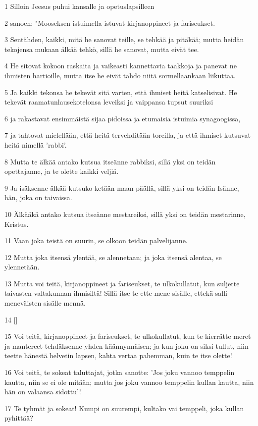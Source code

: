 \par 1 Silloin Jeesus puhui kansalle ja opetuslapsilleen
\par 2 sanoen: "Mooseksen istuimella istuvat kirjanoppineet ja fariseukset.
\par 3 Sentähden, kaikki, mitä he sanovat teille, se tehkää ja pitäkää; mutta heidän tekojensa mukaan älkää tehkö, sillä he sanovat, mutta eivät tee.
\par 4 He sitovat kokoon raskaita ja vaikeasti kannettavia taakkoja ja panevat ne ihmisten hartioille, mutta itse he eivät tahdo niitä sormellaankaan liikuttaa.
\par 5 Ja kaikki tekonsa he tekevät sitä varten, että ihmiset heitä katselisivat. He tekevät raamatunlausekotelonsa leveiksi ja vaippansa tupsut suuriksi
\par 6 ja rakastavat ensimmäistä sijaa pidoissa ja etumaisia istuimia synagoogissa,
\par 7 ja tahtovat mielellään, että heitä tervehditään toreilla, ja että ihmiset kutsuvat heitä nimellä 'rabbi'.
\par 8 Mutta te älkää antako kutsua itseänne rabbiksi, sillä yksi on teidän opettajanne, ja te olette kaikki veljiä.
\par 9 Ja isäksenne älkää kutsuko ketään maan päällä, sillä yksi on teidän Isänne, hän, joka on taivaissa.
\par 10 Älkääkä antako kutsua itseänne mestareiksi, sillä yksi on teidän mestarinne, Kristus.
\par 11 Vaan joka teistä on suurin, se olkoon teidän palvelijanne.
\par 12 Mutta joka itsensä ylentää, se alennetaan; ja joka itsensä alentaa, se ylennetään.
\par 13 Mutta voi teitä, kirjanoppineet ja fariseukset, te ulkokullatut, kun suljette taivasten valtakunnan ihmisiltä! Sillä itse te ette mene sisälle, ettekä salli meneväisten sisälle mennä.
\par 14 []
\par 15 Voi teitä, kirjanoppineet ja fariseukset, te ulkokullatut, kun te kierrätte meret ja mantereet tehdäksenne yhden käännynnäisen; ja kun joku on siksi tullut, niin teette hänestä helvetin lapsen, kahta vertaa pahemman, kuin te itse olette!
\par 16 Voi teitä, te sokeat taluttajat, jotka sanotte: 'Jos joku vannoo temppelin kautta, niin se ei ole mitään; mutta jos joku vannoo temppelin kullan kautta, niin hän on valaansa sidottu'!
\par 17 Te tyhmät ja sokeat! Kumpi on suurempi, kultako vai temppeli, joka kullan pyhittää?

